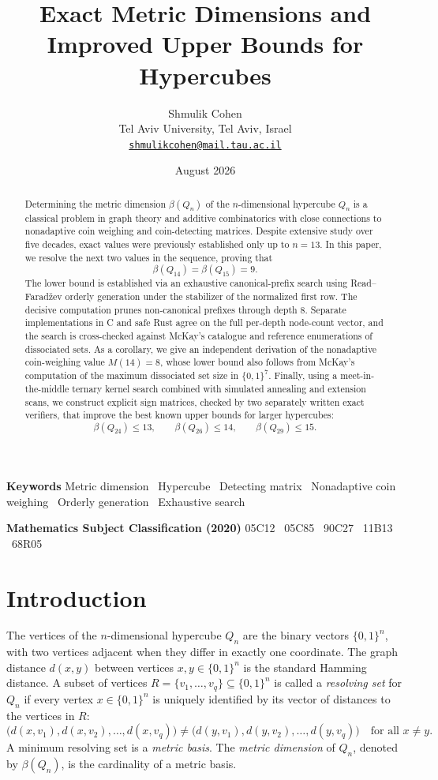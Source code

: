 \documentclass[11pt]{article}
\title{Exact Metric Dimensions and Improved Upper Bounds for Hypercubes}
\author{Shmulik Cohen\\\normalsize Tel Aviv University, Tel Aviv, Israel\\\normalsize\href{mailto:shmulikcohen@mail.tau.ac.il}{\texttt{shmulikcohen@mail.tau.ac.il}}}
\date{August 2026}
\theoremstyle{plain}
\theoremstyle{definition}
\newcommand{\bits}{\{0,1\}}
\begin{document}
\maketitle

\begin{abstract}
Determining the metric dimension $\beta(Q_n)$ of the $n$-dimensional hypercube $Q_n$ is a classical problem in graph theory and additive combinatorics with close connections to nonadaptive coin weighing and coin-detecting matrices. Despite extensive study over five decades, exact values were previously established only up to $n=13$. In this paper, we resolve the next two values in the sequence, proving that
\[
  \beta(Q_{14}) = \beta(Q_{15}) = 9.
\]
The lower bound is established via an exhaustive canonical-prefix search using Read--Farad\v{z}ev orderly generation under the stabilizer of the normalized first row. The decisive computation prunes non-canonical prefixes through depth 8. Separate implementations in C and safe Rust agree on the full per-depth node-count vector, and the search is cross-checked against McKay's catalogue and reference enumerations of dissociated sets. As a corollary, we give an independent derivation of the nonadaptive coin-weighing value $M(14) = 8$, whose lower bound also follows from McKay's computation of the maximum dissociated set size in $\{0,1\}^7$. Finally, using a meet-in-the-middle ternary kernel search combined with simulated annealing and extension scans, we construct explicit sign matrices, checked by two separately written exact verifiers, that improve the best known upper bounds for larger hypercubes:
\[
  \beta(Q_{24}) \le 13, \qquad
  \beta(Q_{26}) \le 14, \qquad
  \beta(Q_{29}) \le 15.
\]
\end{abstract}

\medskip
\noindent\textbf{Keywords} Metric dimension \textperiodcentered\ Hypercube \textperiodcentered\ Detecting matrix \textperiodcentered\ Nonadaptive coin weighing \textperiodcentered\ Orderly generation \textperiodcentered\ Exhaustive search

\medskip
\noindent\textbf{Mathematics Subject Classification (2020)} 05C12 \textperiodcentered\ 05C85 \textperiodcentered\ 90C27 \textperiodcentered\ 11B13 \textperiodcentered\ 68R05

\section{Introduction}\label{sec:intro}

The vertices of the $n$-dimensional hypercube $Q_n$ are the binary vectors $\bits^n$, with two vertices adjacent when they differ in exactly one coordinate. The graph distance $d(x,y)$ between vertices $x, y \in \bits^n$ is the standard Hamming distance. A subset of vertices $R = \{v_1, \dots, v_q\} \subseteq \bits^n$ is called a \emph{resolving set} for $Q_n$ if every vertex $x \in \bits^n$ is uniquely identified by its vector of distances to the vertices in $R$:
\[
  \bigl(d(x,v_1), d(x,v_2), \dots, d(x,v_q)\bigr) \neq \bigl(d(y,v_1), d(y,v_2), \dots, d(y,v_q)\bigr) \quad \text{for all } x \neq y.
\]
A minimum resolving set is a \emph{metric basis}. The \emph{metric dimension} of $Q_n$, denoted by $\beta(Q_n)$, is the cardinality of a metric basis.
\end{document}
